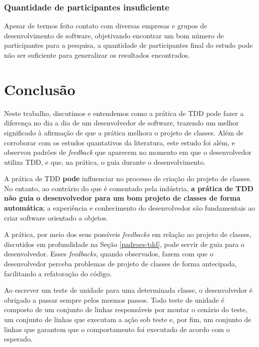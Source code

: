 \documentclass[conference]{IEEEtran}
\begin{document}
\subsubsection{Quantidade de participantes insuficiente}

Apesar de termos feito contato
com diversas empresas e grupos de desenvolvimento de software,
objetivando encontrar um bom número de participantes para a pesquisa,
a quantidade de participantes final do estudo pode não ser suficiente para generalizar
os resultados encontrados. 

\section{Conclusão}

Neste trabalho, discutimos e entendemos como a prática de TDD pode
fazer a diferença no dia a dia de um desenvolvedor de software,
trazendo um melhor significado à afirmação de que a prática melhora o projeto de classes.
Além de corroborar com os estudos quantativos da literatura, este estudo
foi além, e observou padrões de \textit{feedback} que aparecem
no momento em que o desenvolvedor utiliza TDD, e que, na prática, o guia durante
o desenvolvimento.

A prática de TDD \textbf{pode} influenciar no processo de criação do projeto de classes.
No entanto, ao contrário do que é comentado pela indústria,
\textbf{a prática de TDD não guia o desenvolvedor para um bom projeto de classes
de forma automática}; a experiência e conhecimento 
do desenvolvedor são fundamentais ao criar software orientado a objetos. 

A prática, por meio dos seus possíveis \textit{feedbacks} em relação ao
projeto de classes, discutidos
em profundidade na Seção \ref{padroes-tdd}, pode servir de guia
para o desenvolvedor. Esses \textit{feedbacks}, quando observados, fazem
com que o desenvolvedor perceba problemas de projeto de classes de
forma antecipada, facilitando a refatoração do código.

Ao escrever um teste de unidade para uma determinada classe, o desenvolvedor
é obrigado a passar sempre pelos mesmos passos. Todo teste de unidade é composto
de um conjunto de linhas responsáveis por montar o cenário do teste, um conjunto
de linhas que executam a ação sob teste e, por fim, um conjunto de linhas que
garantem que o comportamento foi executado de acordo com o esperado.
\end{document}
